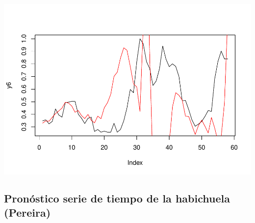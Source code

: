 \documentclass[
]{book}
\begin{document}
\includegraphics{bookdown-demo_files/figure-latex/unnamed-chunk-199-1.pdf}

\hypertarget{pronuxf3stico-serie-de-tiempo-de-la-habichuela-pereira}{%
\subsection{Pronóstico serie de tiempo de la habichuela (Pereira)}\label{pronuxf3stico-serie-de-tiempo-de-la-habichuela-pereira}}
\end{document}
